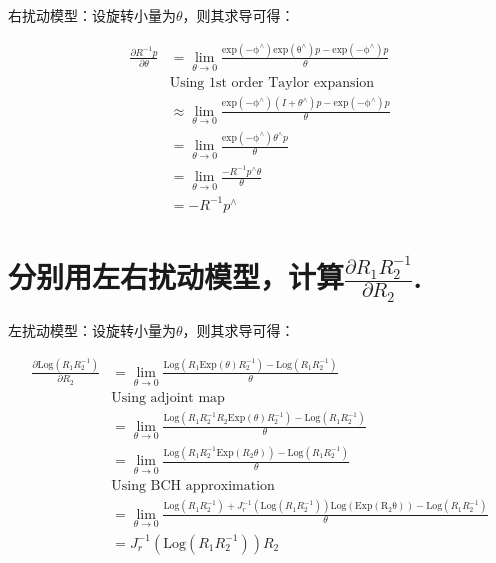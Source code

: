 \documentclass{article}
\begin{document}
右扰动模型：设旋转小量为$\theta$，则其求导可得：

\begin{equation*}
\begin{aligned}
\frac{\partial R^{-1}p}{\partial \theta}
    &= \lim\limits_{\theta\to 0}
        \frac
            {\mathrm{exp(-\phi^{\wedge})}\mathrm{exp(\theta^{\wedge})}p - \mathrm{exp(-\phi^{\wedge})}p}
            {\theta} \\
    &\text{Using 1st order Taylor expansion} \\
    &\approx \lim\limits_{\theta\to 0}
        \frac
            {\mathrm{exp(-\phi^{\wedge})}(I+\theta^{\wedge})p - \mathrm{exp(-\phi^{\wedge})}p}
            {\theta} \\
    &= \lim\limits_{\theta\to 0}
        \frac
            {\mathrm{exp(-\phi^{\wedge})}\theta^{\wedge}p}
            {\theta} \\
    &= \lim\limits_{\theta\to 0}
        \frac
            {-R^{-1}p^{\wedge}\theta}
            {\theta} \\
    &= -R^{-1}p^{\wedge}
\end{aligned}
\end{equation*}

\section{分别用左右扰动模型，计算$\frac{\partial R_1R_2^{-1}}{\partial R_2}$.}

左扰动模型：设旋转小量为$\theta$，则其求导可得：

\begin{equation*}
\begin{aligned}
\frac{\partial \mathrm{Log}(R_1R_2^{-1})}{\partial R_2}
    &= \lim\limits_{\theta\to 0}
        \frac
            {\mathrm{Log}(R_1\mathrm{Exp}(\theta)R_2^{-1})-\mathrm{Log}(R_1R_2^{-1})}
            {\theta} \\
    &\text{Using adjoint map} \\
    &= \lim\limits_{\theta\to 0}
        \frac
            {\mathrm{Log}(R_1R_2^{-1}R_2\mathrm{Exp}(\theta)R_2^{-1})-\mathrm{Log}(R_1R_2^{-1})}
            {\theta} \\
    &= \lim\limits_{\theta\to 0}
        \frac
            {\mathrm{Log}(R_1R_2^{-1}\mathrm{Exp}({R_2\theta}))-\mathrm{Log}(R_1R_2^{-1})}
            {\theta} \\
    &\text{Using BCH approximation} \\
    &= \lim\limits_{\theta\to 0}
        \frac
            {\mathrm{Log}(R_1R_2^{-1})+J_r^{-1}(\mathrm{Log}(R_1R_2^{-1}))\mathrm{Log}(\mathrm{Exp(R_2\theta)})-\mathrm{Log}(R_1R_2^{-1})}
            {\theta} \\
    &= J_r^{-1}(\mathrm{Log}(R_1R_2^{-1}))R_2
\end{aligned}
\end{equation*}
\end{document}
